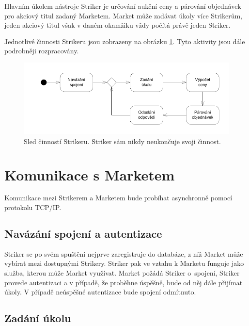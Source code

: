 \documentclass[thesis=M,czech]{FITthesis}[2012/06/26]
\begin{document}
Hlavním úkolem nástroje Striker je určování aukční ceny a párování objednávek pro akciový titul zadaný Marketem. Market může 
zadávat úkoly více Strikerům, jeden akciový titul však v daném okamžiku vždy počítá právě jeden Striker.

Jednotlivé činnosti Strikeru jsou zobrazeny na obrázku \ref{fig:striker-steps}. Tyto aktivity jsou dále podrobněji rozpracovány.


\begin{figure}\centering
	\includegraphics[]{images/striker-steps} 
	\caption[Sled činností Strikeru]{Sled činností Strikeru. Striker sám nikdy neukončuje svoji činnost.}\label{fig:striker-steps}
\end{figure}



\section{Komunikace s Marketem}

Komunikace mezi Strikerem a Marketem bude probíhat asynchronně pomocí protokolu TCP/IP. 


\subsection{Navázání spojení a autentizace}

Striker se po svém spuštění nejprve zaregistruje do databáze, z níž Market může vybírat mezi 
dostupnými Strikery. Striker pak ve vztahu k Marketu funguje jako služba, kterou může Market využívat. 
Market požádá Striker o~spojení, Striker provede autentizaci a v případě, že proběhne úspěšně, bude od něj dále přijímat úkoly. 
V případě neúspěšné autentizace bude spojení odmítnuto.


\subsection{Zadání úkolu}
\end{document}
